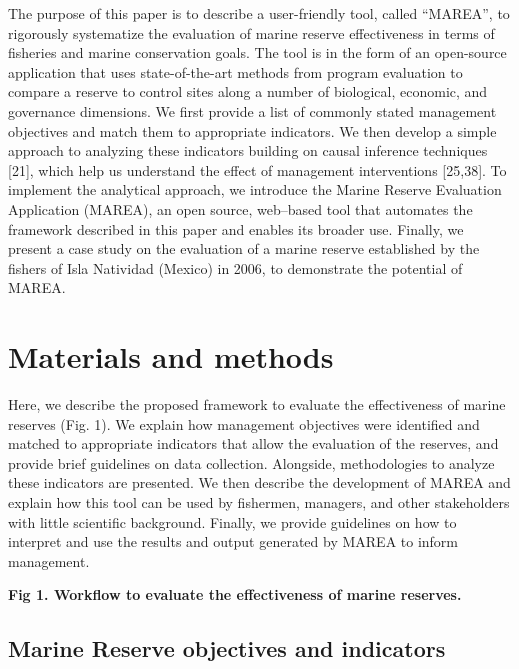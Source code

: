 \documentclass[12pt,]{article}
\begin{document}
The purpose of this paper is to describe a user-friendly tool, called
``MAREA'', to rigorously systematize the evaluation of marine reserve
effectiveness in terms of fisheries and marine conservation goals. The
tool is in the form of an open-source application that uses
state-of-the-art methods from program evaluation to compare a reserve to
control sites along a number of biological, economic, and governance
dimensions. We first provide a list of commonly stated management
objectives and match them to appropriate indicators. We then develop a
simple approach to analyzing these indicators building on causal
inference techniques {[}21{]}, which help us understand the effect of
management interventions {[}25,38{]}. To implement the analytical
approach, we introduce the Marine Reserve Evaluation Application
(MAREA), an open source, web--based tool that automates the framework
described in this paper and enables its broader use. Finally, we present
a case study on the evaluation of a marine reserve established by the
fishers of Isla Natividad (Mexico) in 2006, to demonstrate the potential
of MAREA.

\section{Materials and methods}\label{materials-and-methods}

Here, we describe the proposed framework to evaluate the effectiveness
of marine reserves (Fig. 1). We explain how management objectives were
identified and matched to appropriate indicators that allow the
evaluation of the reserves, and provide brief guidelines on data
collection. Alongside, methodologies to analyze these indicators are
presented. We then describe the development of MAREA and explain how
this tool can be used by fishermen, managers, and other stakeholders
with little scientific background. Finally, we provide guidelines on how
to interpret and use the results and output generated by MAREA to inform
management.

\textbf{Fig 1. Workflow to evaluate the effectiveness of marine
reserves.}

\subsection{Marine Reserve objectives and
indicators}\label{marine-reserve-objectives-and-indicators}
\end{document}
